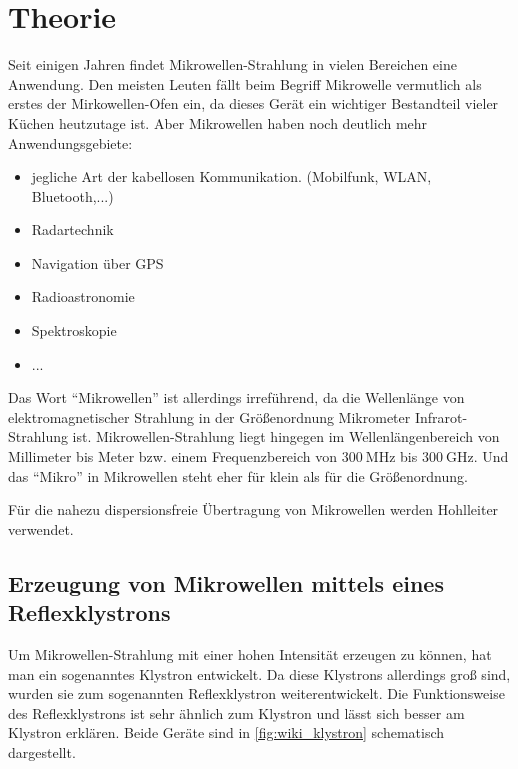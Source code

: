\section{Theorie}
\label{sec:Theorie}

Seit einigen Jahren findet Mikrowellen-Strahlung in vielen Bereichen eine Anwendung. 
Den meisten Leuten fällt beim Begriff Mikrowelle vermutlich als erstes der Mirkowellen-Ofen ein,
da dieses Gerät ein wichtiger Bestandteil vieler Küchen heutzutage ist.
Aber Mikrowellen haben noch deutlich mehr Anwendungsgebiete:
\begin{itemize}
    \item jegliche Art der kabellosen Kommunikation. (Mobilfunk, WLAN, Bluetooth,...)
    \item Radartechnik
    \item Navigation über GPS
    \item Radioastronomie
    \item Spektroskopie
    \item ...
\end{itemize}

Das Wort \enquote{Mikrowellen} ist allerdings irreführend, da die Wellenlänge von elektromagnetischer Strahlung in der Größenordnung Mikrometer 
Infrarot-Strahlung ist.
Mikrowellen-Strahlung liegt hingegen im Wellenlängenbereich von Millimeter bis Meter bzw. einem Frequenzbereich von $\SI{300}{\mega\hertz}$ bis $\SI{300}{\giga\hertz}$.
Und das \enquote{Mikro} in Mikrowellen steht eher für klein als für die Größenordnung.

Für die nahezu dispersionsfreie Übertragung von Mikrowellen werden Hohlleiter verwendet.

\subsection{Erzeugung von Mikrowellen mittels eines Reflexklystrons}
\label{ssec:Erzeugung}

Um Mikrowellen-Strahlung mit einer hohen Intensität erzeugen zu können, hat man ein sogenanntes Klystron entwickelt.
Da diese Klystrons allerdings groß sind, wurden sie zum sogenannten Reflexklystron weiterentwickelt.
Die Funktionsweise des Reflexklystrons ist sehr ähnlich zum Klystron und lässt sich besser am Klystron erklären.
Beide Geräte sind in \autoref{fig:wiki_klystron} schematisch dargestellt.

